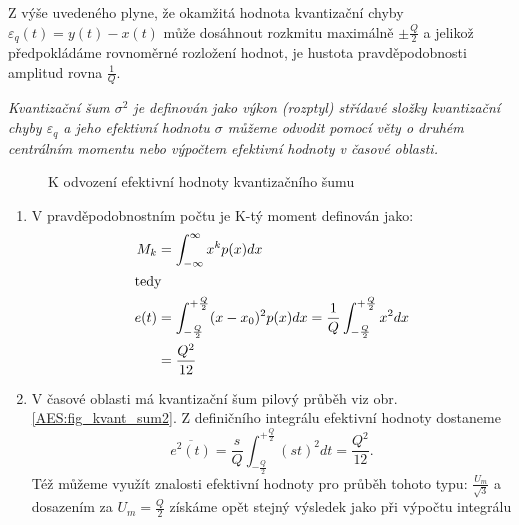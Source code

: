       Z výše uvedeného plyne, že okamžitá hodnota kvantizační chyby $\varepsilon_q(t) = y(t) - x(t)$
      může dosáhnout rozkmitu maximálně $\pm \frac{Q}{2}$ a jelikož předpokládáme rovnoměrné
      rozložení hodnot, je hustota pravděpodobnosti amplitud rovna $\frac{1}{Q}$.

      \emph{Kvantizační šum $\sigma^2$ je definován jako výkon (rozptyl) střídavé složky kvantizační
      chyby $\varepsilon_q$ a jeho efektivní hodnotu $\sigma$ můžeme odvodit pomocí věty o druhém
      centrálním momentu nebo výpočtem efektivní hodnoty v časové oblasti.}

        \begin{figure}[ht!]
          \centering
            {}
            {}
          \caption{K odvození efektivní hodnoty kvantizačního šumu}
          \label{AES:fig_kvant_sum}
        \end{figure}

        \begin{enumerate}[noitemsep]
          \item V pravděpodobnostním počtu je K-tý moment definován jako: 
                \begin{align*}
                  M_k  &= \int_{-\infty}^{\infty} x^k p(x)dx                           \\
                  \shortintertext{tedy}                      
                  e(t) &= \int_{-\frac{Q}{2}}^{+\frac{Q}{2}}(x - x_0)^2p(x)dx = 
                                 \frac{1}{Q}\int_{-\frac{Q}{2}}^{+\frac{Q}{2}}x^2dx    \\
                       &= \frac{Q^2}{12}
                \end{align*}
          \item V časové oblasti má kvantizační šum pilový průběh viz obr.    
                \ref{AES:fig_kvant_sum2}. Z  definičního integrálu efektivní hodnoty dostaneme $$ 
                \overline{e^2(t)} =               
                \frac{s}{Q}\int_{-\frac{Q}{2}}^{+\frac{Q}{2}}(st)^2dt = \frac{Q^2}{12}.$$ Též 
                můžeme využít znalosti efektivní hodnoty pro průběh tohoto typu: 
                $\frac{U_m}{\sqrt{3}}$ a dosazením za $U_m =\frac{Q}{2}$ získáme opět stejný 
                výsledek jako při výpočtu integrálu
        \end{enumerate}

